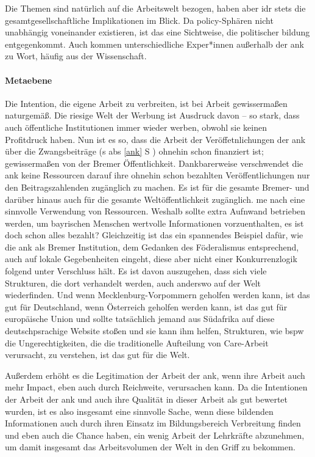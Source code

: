 Die Themen sind natürlich auf die Arbeitswelt bezogen, haben aber \gls{idr} stets die gesamtgesellschaftliche Implikationen im Blick. Da policy-Sphären nicht unabhängig voneinander existieren, ist das eine Sichtweise, die politischer bildung entgegenkommt. 
Auch kommen unterschiedliche Exper*innen außerhalb der \gls{ank} zu Wort, häufig aus der Wissenschaft.

\paragraph{Metaebene}
Die Intention, die eigene Arbeit zu verbreiten, ist bei Arbeit gewissermaßen naturgemäß. Die riesige Welt der Werbung ist Ausdruck davon -- so stark, dass auch öffentliche Institutionen immer wieder werben, obwohl sie keinen Profitdruck haben. 
Nun ist es so, dass die Arbeit der Veröffetnlichungen der \gls{ank} über die Zwangsbeiträge (\gls{s} \gls{abs} \ref{ank} \gls{S} \pageref{ank}) ohnehin schon finanziert ist; gewissermaßen von der Bremer Öffentlichkeit. Dankbarerweise verschwendet die \gls{ank} keine Ressourcen darauf ihre ohnehin schon bezahlten Veröffentlichungen nur den Beitragszahlenden zugänglich zu machen. Es ist für die gesamte Bremer- und darüber hinaus auch für die gesamte Weltöffentlichkeit zugänglich. \Gls{me} nach eine sinnvolle Verwendung von Ressourcen. Weshalb sollte extra Aufnwand betrieben werden, um bayrischen Menschen wertvolle Informationen vorzuenthalten, es ist doch schon alles bezahlt? 
Gleichzeitig ist das ein spannendes Beispiel dafür, wie die \gls{ank} als Bremer Institution, dem Gedanken des Föderalismus entsprechend, auch auf lokale Gegebenheiten eingeht, diese aber nicht einer Konkurrenzlogik folgend unter Verschluss hält. Es ist davon auszugehen, dass sich viele Strukturen, die dort verhandelt werden, auch anderswo auf der Welt wiederfinden. Und wenn Mecklenburg-Vorpommern geholfen werden kann, ist das gut für Deutschland, wenn Österreich geholfen werden kann, ist das gut für europäische Union und sollte tatsächlich jemand aus Südafrika auf diese deutschpsrachige Website stoßen und sie kann ihm helfen, Strukturen, wie \gls{bspw} die Ungerechtigkeiten, die die traditionelle Aufteilung von Care-Arbeit verursacht, zu verstehen, ist das gut für die Welt. 

Außerdem erhöht es die Legitimation der Arbeit der \gls{ank}, wenn ihre Arbeit auch mehr Impact, eben auch durch Reichweite, verursachen kann. Da die Intentionen der Arbeit der \gls{ank} und auch ihre Qualität in dieser Arbeit als gut bewertet wurden, ist es also insgesamt eine sinnvolle Sache, wenn diese bildenden Informationen auch durch ihren Einsatz im Bildungsbereich Verbreitung finden und eben auch die Chance haben, ein wenig Arbeit der Lehrkräfte abzunehmen, um damit insgesamt das Arbeitsvolumen der Welt in den Griff zu bekommen. 

